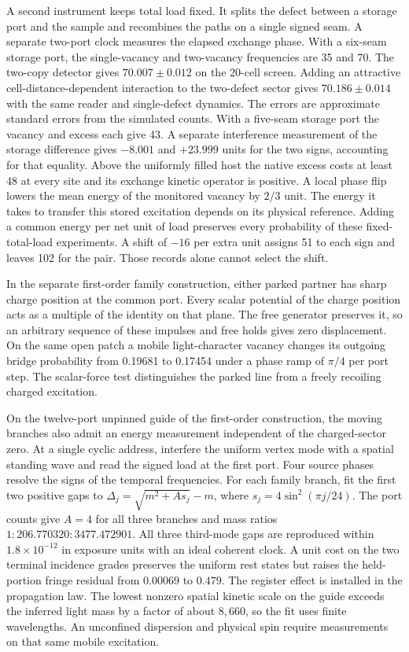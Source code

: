 \documentclass[11pt]{article}
\theoremstyle{definition}
\theoremstyle{remark}
\theoremstyle{plain}
\begin{document}
A second instrument keeps total load fixed. It splits the defect
between a storage port and the sample and recombines the paths on a
single signed seam. A separate two-port clock measures the elapsed
exchange phase. With a six-seam storage port, the single-vacancy and
two-vacancy frequencies are 35 and 70. The two-copy detector gives
$70.007\pm0.012$ on the 20-cell screen. Adding an attractive
cell-distance-dependent interaction to the two-defect sector gives
$70.186\pm0.014$ with the same reader and single-defect dynamics.
The errors are approximate standard errors from the simulated counts.
With a five-seam storage port the vacancy and excess each give 43.
A separate interference measurement of the storage difference gives
$-8.001$ and $+23.999$ units for the two signs, accounting for that
equality. Above the uniformly filled host the native excess costs at
least 48 at every site and its exchange kinetic operator is positive.
A local phase flip lowers the mean energy of the monitored vacancy
by $2/3$ unit. The energy it takes to transfer this stored excitation
depends on its physical reference. Adding a common energy per net
unit of load preserves every probability of these fixed-total-load
experiments. A shift of $-16$ per extra unit assigns 51 to each sign
and leaves 102 for the pair. Those records alone cannot select the shift.

In the separate first-order family construction, either parked partner
has sharp charge position at the common port. Every scalar potential of
the charge position acts as a multiple of the identity on that plane.
The free generator preserves it, so an arbitrary sequence of these
impulses and free holds gives zero displacement. On the same open
patch a mobile light-character vacancy changes its outgoing bridge
probability from 0.19681 to 0.17454 under a phase ramp of $\pi/4$ per
port step. The scalar-force test distinguishes the parked line from
a freely recoiling charged excitation.

On the twelve-port unpinned guide of the first-order construction,
the moving branches also admit an energy measurement independent of
the charged-sector zero. At a single cyclic address, interfere the
uniform vertex mode with a spatial standing wave and read the signed
load at the first port. Four source phases resolve the signs of the
temporal frequencies. For each family branch, fit the first two
positive gaps to $\Delta_j=\sqrt{m^2+A s_j}-m$, where
$s_j=4\sin^2(\pi j/24)$. The port counts give $A=4$ for all three
branches and mass ratios $1:206.770320:3477.472901$. All three
third-mode gaps are reproduced within $1.8\times10^{-12}$ in exposure
units with an ideal coherent clock. A unit cost on the two terminal
incidence grades preserves the uniform rest states but raises the
held-portion fringe residual from $0.00069$ to $0.479$.
The register effect is installed in the propagation law. The lowest
nonzero spatial kinetic scale on the guide exceeds the inferred light
mass by a factor of about $8{,}660$, so the fit uses finite
wavelengths. An unconfined dispersion and physical spin require
measurements on that same mobile excitation.
\end{document}
